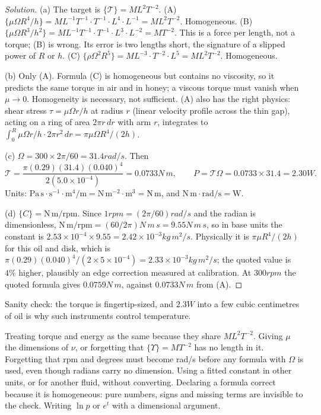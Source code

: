 \begin{proof}[Solution]
(a) The target is $\{\mathcal{T}\} = ML^2T^{-2}$.
(A) $\{\mu\Omega R^4/h\} = ML^{-1}T^{-1} \cdot T^{-1} \cdot L^4 \cdot L^{-1} = ML^2T^{-2}$. Homogeneous.
(B) $\{\mu\Omega R^3/h^2\} = ML^{-1}T^{-1} \cdot T^{-1} \cdot L^3 \cdot L^{-2} = MT^{-2}$. This is a force per length, not a torque; (B) is wrong. Its error is two lengths short, the signature of a slipped power of $R$ or $h$.
(C) $\{\rho\Omega^2R^5\} = ML^{-3} \cdot T^{-2} \cdot L^5 = ML^2T^{-2}$. Homogeneous.

(b) Only (A). Formula (C) is homogeneous but contains no viscosity, so it predicts the same torque in air and in honey; a viscous torque must vanish when $\mu \to 0$. Homogeneity is necessary, not sufficient. (A) also has the right physics: shear stress $\tau = \mu \Omega r/h$ at radius $r$ (linear velocity profile across the thin gap), acting on a ring of area $2\pi r\,dr$ with arm $r$, integrates to $\int_0^R \mu\Omega r/h \cdot 2\pi r^2 \, dr = \pi\mu\Omega R^4/(2h)$.

(c) $\Omega = 300 \times 2\pi/60 = 31.4\unit{rad/s}$. Then
\[
\mathcal{T} = \frac{\pi (0.29)(31.4)(0.040)^4}{2 (5.0\times10^{-4})} = 0.0733\unit{N\,m}, \qquad
P = \mathcal{T}\Omega = 0.0733 \times 31.4 = 2.30\unit{W}.
\]
Units: $\mathrm{Pa\,s} \cdot \mathrm{s^{-1}} \cdot \mathrm{m^4}/\mathrm{m} = \mathrm{N\,m^{-2}} \cdot \mathrm{m^3} = \mathrm{N\,m}$, and $\mathrm{N\,m} \cdot \mathrm{rad/s} = \mathrm{W}$.

(d) $\{C\} = \mathrm{N\,m}/\mathrm{rpm}$. Since $1\unit{rpm} = (2\pi/60)\unit{rad/s}$ and the radian is dimensionless, $\mathrm{N\,m/rpm} = (60/2\pi)\unit{N\,m\,s} = 9.55\unit{N\,m\,s}$, so in base units the constant is $2.53\times10^{-4} \times 9.55 = 2.42\times10^{-3}\unit{kg\,m^2/s}$. Physically it is $\pi\mu R^4/(2h)$ for this oil and disk, which is $\pi (0.29)(0.040)^4/(2 \times 5\times10^{-4}) = 2.33\times10^{-3}\unit{kg\,m^2/s}$; the quoted value is $4\%$ higher, plausibly an edge correction measured at calibration. At $300\unit{rpm}$ the quoted formula gives $0.0759\unit{N\,m}$, against $0.0733\unit{N\,m}$ from (A).
\end{proof}

Sanity check: the torque is fingertip-sized, and $2.3\unit{W}$ into a few cubic centimetres of oil is why such instruments control temperature.

\begin{trap}
Treating torque and energy as the same because they share $ML^2T^{-2}$. Giving $\mu$ the dimensions of $\nu$, or forgetting that $\{\Upsilon\} = MT^{-2}$ has no length in it. Forgetting that rpm and degrees must become rad/s before any formula with $\Omega$ is used, even though radians carry no dimension. Using a fitted constant in other units, or for another fluid, without converting. Declaring a formula correct because it is homogeneous: pure numbers, signs and missing terms are invisible to the check. Writing $\ln p$ or $e^{t}$ with a dimensional argument.
\end{trap}

